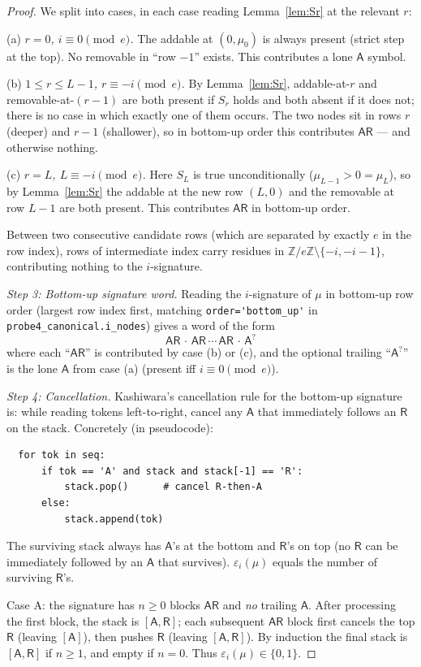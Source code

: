 \documentclass[11pt]{article}
\theoremstyle{definition}
\newcommand{\ZZ}{\mathbb{Z}}
\newcommand{\eps}{\varepsilon}
\newcommand{\Aa}{{\mathsf A}}
\newcommand{\Rr}{{\mathsf R}}
\begin{document}
\begin{proof}
We split into cases, in each case reading Lemma~\ref{lem:Sr} at the relevant
$r$:

(a) \emph{$r = 0$, $i \equiv 0 \pmod e$.} The addable at $(0, \mu_0)$ is
always present (strict step at the top). No removable in ``row $-1$''
exists. This contributes a lone $\Aa$ symbol.

(b) \emph{$1 \le r \le L - 1$, $r \equiv -i \pmod e$.} By
Lemma~\ref{lem:Sr}, addable-at-$r$ and removable-at-$(r-1)$ are both present
if $S_r$ holds and both absent if it does not; there is no case in which
exactly one of them occurs. The two nodes sit in rows $r$ (deeper) and
$r-1$ (shallower), so in bottom-up order this contributes $\Aa\Rr$ --- and
otherwise nothing.

(c) \emph{$r = L$, $L \equiv -i \pmod e$.} Here $S_L$ is true
unconditionally ($\mu_{L-1} > 0 = \mu_L$), so by Lemma~\ref{lem:Sr} the
addable at the new row $(L,0)$ and the removable at row $L-1$ are both
present. This contributes $\Aa\Rr$ in bottom-up order.

Between two consecutive candidate rows (which are separated by exactly
$e$ in the row index), rows of intermediate index carry residues in
$\ZZ/e\ZZ \setminus \{-i, -i-1\}$, contributing nothing to the
$i$-signature.

\medskip
\emph{Step 3: Bottom-up signature word.} Reading the $i$-signature of $\mu$
in bottom-up row order (largest row index first, matching
\verb|order='bottom_up'| in \verb|probe4_canonical.i_nodes|) gives a word
of the form
\[
  \Aa\Rr \,\cdot\, \Aa\Rr \,\cdots\, \Aa\Rr \,\cdot\, \Aa^?
\]
where each ``$\Aa\Rr$'' is contributed by case (b) or (c), and the
optional trailing ``$\Aa^?$'' is the lone $\Aa$ from case (a) (present
iff $i \equiv 0 \pmod e$).

\medskip
\emph{Step 4: Cancellation.} Kashiwara's cancellation rule for the
bottom-up signature is: while reading tokens left-to-right, cancel any
$\Aa$ that immediately follows an $\Rr$ on the stack. Concretely (in
pseudocode):
\begin{verbatim}
  for tok in seq:
      if tok == 'A' and stack and stack[-1] == 'R':
          stack.pop()      # cancel R-then-A
      else:
          stack.append(tok)
\end{verbatim}
The surviving stack always has $\Aa$'s at the bottom and $\Rr$'s on top
(no $\Rr$ can be immediately followed by an $\Aa$ that survives).
$\eps_i(\mu)$ equals the number of surviving $\Rr$'s.

Case A: the signature has $n \ge 0$ blocks $\Aa\Rr$ and \emph{no} trailing
$\Aa$. After processing the first block, the stack is $[\Aa, \Rr]$; each
subsequent $\Aa\Rr$ block first cancels the top $\Rr$ (leaving $[\Aa]$),
then pushes $\Rr$ (leaving $[\Aa, \Rr]$). By induction the final stack is
$[\Aa, \Rr]$ if $n \ge 1$, and empty if $n = 0$. Thus $\eps_i(\mu) \in \{0, 1\}$.


\end{proof}
\end{document}
